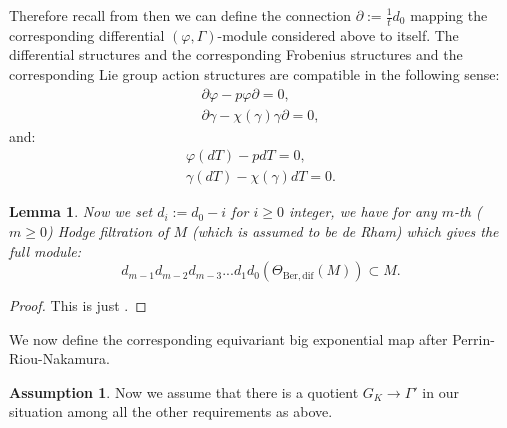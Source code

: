 \documentclass[12pt]{amsart}
\newtheorem{lemma}[theorem]{Lemma}
\theoremstyle{definition}
\numberwithin{equation}{section}
\newtheorem{assumption}[theorem]{Assumption}
\begin{document}
\indent Therefore recall from \cite[Section 3.2]{Nakamura1} then we can define the connection $\partial:=\frac{1}{t}d_0$ mapping the corresponding differential $(\varphi,\Gamma)$-module considered above to itself. The differential structures and the corresponding Frobenius structures and the corresponding Lie group action structures are compatible in the following sense:
\begin{align}
\partial\varphi-p\varphi \partial=0,\\
\partial\gamma-\chi(\gamma)\gamma \partial=0,	
\end{align}
and:
\begin{align}
\varphi(dT)-pdT=0,\\
\gamma(dT)-\chi(\gamma)dT=0.	
\end{align}



\begin{lemma}
Now we set $d_i:=d_0-i$ for $i\geq 0$ integer, we have for any $m$-th ($m\geq 0$) Hodge filtration of $M$ (which is assumed to be de Rham) which gives the full module:
\begin{displaymath}
d_{m-1}d_{m-2}d_{m-3}...d_1d_0(\Theta_{\mathrm{Ber,dif}}(M))\subset M.	
\end{displaymath}
	
\end{lemma}


\begin{proof}
This is just \cite[Lemma 3.6]{Nakamura1}.	
\end{proof}


\indent We now define the corresponding equivariant big exponential map after Perrin-Riou-Nakamura.


\begin{assumption}
Now we assume that there is a quotient $G_K\rightarrow \Gamma'$ in our situation among all the other requirements as above.	
\end{assumption}
	
\end{document}
